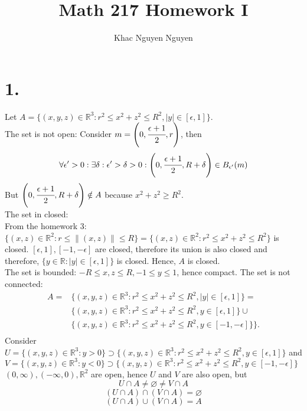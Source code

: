 \documentclass[11pt]{article}
\title{\textbf{Math 217 Homework I}}
\author{Khac Nguyen Nguyen}
\date{}
\begin{document}
\section*{1.}
Let $A=\{(x,y,z) \in \mathbb{R}^3: r^2 \le x^2+ z^2 \le R^2, |y| \in [\epsilon,1]\}$. \\
The set is not open: Consider $m = \left(0, \cfrac{\epsilon +1}{2}, r \right)$, then
\[
\forall \epsilon' >0: \exists \delta: \epsilon' >\delta >0: \left(0, \cfrac{\epsilon+1}{2}, R+\delta \right) \in B_{\epsilon'}(m)
\]
But $\left(0, \cfrac{\epsilon+1}{2},R+\delta \right) \notin A$ because $x^2 + z^2 \ge R^2$. \\
The set in closed: \\
From the homework 3: \\
$\{(x,z) \in \mathbb{R}^2: r \le \|(x,z)\| \le R\} = \{(x,z) \in \mathbb{R}^2: r^2 \le x^2 + z^2 \le R^2\}$ is closed. $[\epsilon,1], [-1,-\epsilon]$ are closed, therefore its union is also closed and therefore, $\{y \in \mathbb{R}: |y| \in [\epsilon,1]\}$ is closed. Hence, $A$ is closed. \\
The set is bounded:
$-R \le x,z \le R, -1 \le y \le 1$, hence compact.
The set is not connected: \\
\begin{equation*}
\begin{aligned}
A=&\{(x,y,z) \in \mathbb{R}^3: r^2 \le x^2+ z^2 \le R^2, |y| \in [\epsilon,1]\} = \\
&\{(x,y,z) \in \mathbb{R}^3: r^2 \le x^2+ z^2 \le R^2, y \in [\epsilon,1]\} \cup \\
&\{(x,y,z) \in \mathbb{R}^3: r^2 \le x^2+ z^2 \le R^2, y \in [-1,-\epsilon]\}\}. \\
\end{aligned}
\end{equation*}
Consider \\
$U = \{(x,y,z) \in \mathbb{R}^3: y>0\} \supset \{(x,y,z) \in \mathbb{R}^3: r^2 \le x^2+ z^2 \le R^2, y \in [\epsilon,1]\}$ and \\$V =\{(x,y,z) \in \mathbb{R}^3: y<0\} \supset \{(x,y,z) \in \mathbb{R}^3: r^2 \le x^2+ z^2 \le R^2, y \in [-1,-\epsilon]\}$ \\
$(0,\infty), (-\infty,0), \mathbb{R}^2$ are open, hence $U$ and $V$ are also open, but
\[ U \cap A \ne \varnothing \ne V \cap A\]
\[(U \cap A) \cap (V \cap A) = \varnothing\]
\[(U \cap A) \cup (V \cap A) = A\]
\pagebreak
\end{document}
